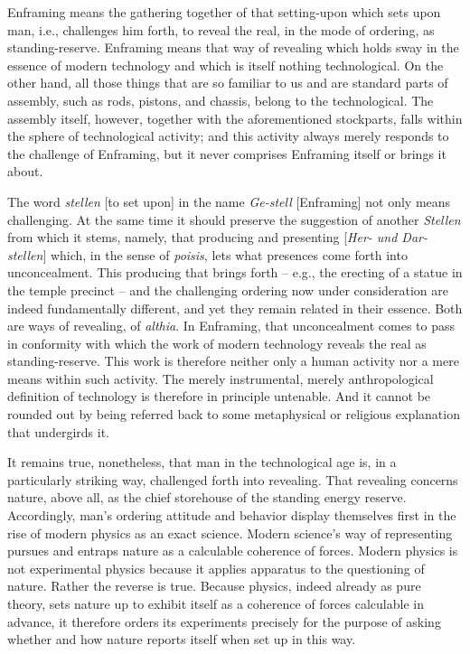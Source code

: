 Enframing means the gathering together of that setting-upon which sets upon man, i.e., challenges him forth, to reveal the real, in the mode of ordering, as standing-reserve. Enframing means that way of revealing which holds sway in the essence of modern technology and which is itself nothing technological. On the other hand, all those things that are so familiar to us and are standard parts of assembly, such as rods, pistons, and chassis, belong to the technological. The assembly itself, however, together with the aforementioned stockparts, falls within the sphere of technological activity; and this activity always merely responds to the challenge of Enframing, but it never comprises Enframing itself or brings it about.

The word \textit{stellen} [to set upon] in the name \textit{Ge-stell} [Enframing] not only means challenging. At the same time it should preserve the suggestion of another \textit{Stellen} from which it stems, namely, that producing and presenting [\textit{Her- und Dar-stellen}] which, in the sense of \textit{poisis}, lets what presences come forth into unconcealment. This producing that brings forth -- e.g., the erecting of a statue in the temple precinct -- and the challenging ordering now under consideration are indeed fundamentally different, and yet they remain related in their essence. Both are ways of revealing, of \textit{althia}. In Enframing, that unconcealment comes to pass in conformity with which the work of modern technology reveals the real as standing-reserve. This work is therefore neither only a human activity nor a mere means within such activity. The merely instrumental, merely anthropological definition of technology is therefore in principle untenable. And it cannot be rounded out by being referred back to some metaphysical or religious explanation that undergirds it.

It remains true, nonetheless, that man in the technological age is, in a particularly striking way, challenged forth into revealing. That revealing concerns nature, above all, as the chief storehouse of the standing energy reserve. Accordingly, man's ordering attitude and behavior display themselves first in the rise of modern physics as an exact science. Modern science's way of representing pursues and entraps nature as a calculable coherence of forces. Modern physics is not experimental physics because it applies apparatus to the questioning of nature. Rather the reverse is true. Because physics, indeed already as pure theory, sets nature up to exhibit itself as a coherence of forces calculable in advance, it therefore orders its experiments precisely for the purpose of asking whether and how nature reports itself when set up in this way.

